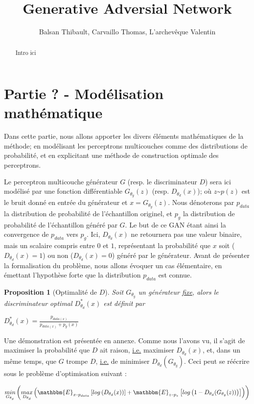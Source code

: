 \documentclass[letterpaper]{oup-contemporary}
\title{Generative Adversial Network}
\author[1]{Balsan Thibault, Carvaillo Thomas, L'archevêque Valentin}
\newtheorem{prop}{Proposition}
\begin{document}
\begin{frontmatter}
\maketitle
\begin{abstract}
Intro ici
\end{abstract}
\end{frontmatter}



\section{Partie ? - Modélisation mathématique}
Dans cette partie, nous allons apporter les divers éléments mathématiques de la méthode; en modélisant les perceptrons multicouches comme des distributions de probabilité, et en explicitant une méthode de construction optimale des perceptrons.\newline

Le perceptron multicouche générateur $G$ (resp. le discriminateur $D$) sera ici modélisé par une fonction différentiable $G_{\theta_g}(z)$ (resp. $D_{\theta_d}(x)$); où $z \text{\textasciitilde} p(z)$ est le bruit donné en entrée du générateur et $x = G_{\theta_g}(z)$.
Nous dénoterons par $p_{data}$ la distribution de probabilité de l'échantillon originel, et $p_g$ la distribution de probabilité de l'échantillon généré par $G$. 
Le but de ce GAN étant ainsi la convergence de $p_{data}$ vers $p_g$.
Ici, $D_{\theta_d}(x)$ ne retournera pas une valeur binaire, mais un scalaire compris entre $0$ et $1$, représentant la probabilité que $x$ soit ($D_{\theta_d}(x)=1$) ou non ($D_{\theta_d}(x)=0$) généré par le générateur. \newline
Avant de présenter la formalisation du problème, nous allons évoquer un cas élémentaire, en émettant l'hypothèse forte que la distribution $p_{data}$ est connue.
\begin{prop}[Optimalité de $D$]
    Soit $G_{\theta_g}$ un générateur \underline{fixe}, alors le discriminateur optimal $D^*_{\theta_d}(x)$ est définit par
    \begin{center}
        $D^*_{\theta_d}(x) = \frac{p_{data(x)}}{p_{data(x)} + p_g(x)}$ 
    \end{center}
\end{prop}
Une démonstration est présentée en annexe.\newline
Comme nous l'avons vu, il s'agit de maximiser la probabilité que $D$ ait raison, \underline{i.e.} maximiser $D_{\theta_d}(x)$, et, dans un même temps, que $G$ trompe $D$, \underline{i.e.} de minimiser $D_{\theta_d}(G_{\theta_g})$.
Ceci peut se réécrire sous le problème d'optimisation suivant :
\begin{center}
    $\underset{G_{\theta_g}}{min}\left(\underset{D_{\theta_d}}{max}\left(\mathbbm{E}_{x \text{\textasciitilde} p_{data}}\left[log\left(D_{\theta_d}(x)\right)\right] + \mathbbm{E}_{z \text{\textasciitilde} p_z}\left[log\left(1 - D_{\theta_d}(G_{\theta_g}(z))\right)\right]\right)\right)$
\end{center}
\end{document}
